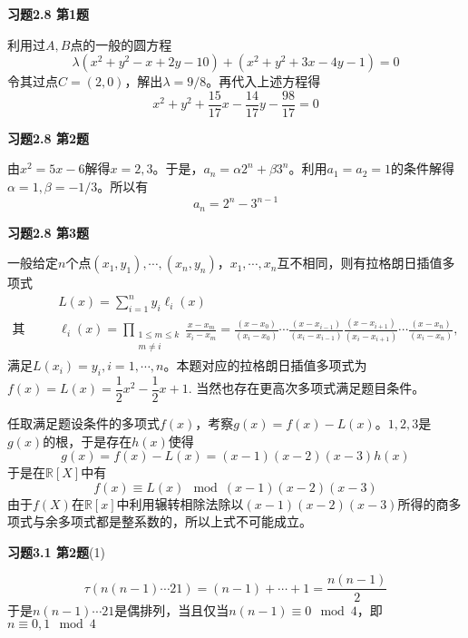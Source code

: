 \renewcommand{\newpageorvspace}{\vspace{2em}}

\date{第六次作业}



\maketitle

{\bf 习题2.8 第1题}

利用过$A,B$点的一般的圆方程
$$\lambda (x^2+y^2-x+2y-10) + (x^2+y^2+3x-4y-1) = 0$$
令其过点$C = (2,0)$，解出$\lambda = 9/8$。再代入上述方程得
$$x^2+y^2+\dfrac{15}{17}x-\dfrac{14}{17}y-\dfrac{98}{17}=0$$

\newpageorvspace

{\bf 习题2.8 第2题}

由$x^2 = 5x - 6$解得$x = 2,3$。于是，$a_n = \alpha 2^n + \beta3^n$。利用$a_1=a_2=1$的条件解得$\alpha = 1, \beta = -1/3$。所以有
$$a_n = 2^n - 3^{n-1}$$

\newpageorvspace

{\bf 习题2.8 第3题}

一般给定$n$个点$(x_1,y_1),\cdots,(x_n,y_n)$，$x_1,\cdots,x_n$互不相同，则有拉格朗日插值多项式
\begin{align*}
& L(x) = \sum_{i=1}^{n}y_{i}\ell_{i}(x) \\
\text{其中，} & \ell_{i}(x) = \prod_{\begin{smallmatrix}1\leq m\leq k\\m\neq i\end{smallmatrix}}{\frac {x-x_{m}}{x_{i}-x_{m}}}={\frac {(x-x_{0})}{(x_{i}-x_{0})}}\cdots {\frac {(x-x_{i-1})}{(x_{i}-x_{i-1})}}{\frac {(x-x_{i+1})}{(x_{i}-x_{i+1})}}\cdots {\frac {(x-x_{n})}{(x_{i}-x_{n})}},
\end{align*}
满足$L(x_i) = y_i, i=1,\cdots,n$。本题对应的拉格朗日插值多项式为$f(x) = L(x) = \dfrac{1}{2}x^2 - \dfrac{1}{2}x + 1$. 当然也存在更高次多项式满足题目条件。

任取满足题设条件的多项式$f(x)$，考察$g(x) = f(x) - L(x)$。$1,2,3$是$g(x)$的根，于是存在$h(x)$使得
$$g(x) = f(x) - L(x) = (x-1)(x-2)(x-3) h(x)$$
于是在$\mathbb{R}[X]$中有
$$f(x) \equiv L(x) \mod (x-1)(x-2)(x-3)$$
由于$f(X)$在$\mathbb{R}[x]$中利用辗转相除法除以$(x-1)(x-2)(x-3)$所得的商多项式与余多项式都是整系数的，所以上式不可能成立。

\newpageorvspace

{\bf 习题3.1 第2题}(1)

$$\tau(n(n-1)\cdots 21) = (n-1) + \cdots + 1 = \dfrac{n(n-1)}{2}$$
于是$n(n-1)\cdots 21$是偶排列，当且仅当$n(n-1)\equiv 0 \mod 4$，即$n\equiv 0,1 \mod 4$

